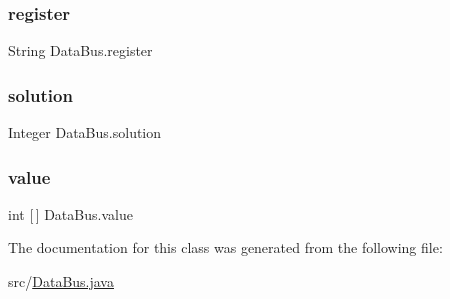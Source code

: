 \mbox{\label{class_data_bus_afd480f15b307b1c64e3511d363a4de29}} 
\subsubsection{\texorpdfstring{register}{register}}
{\footnotesize\ttfamily String Data\+Bus.\+register\hspace{0.3cm}{\ttfamily [private]}}

\mbox{\label{class_data_bus_a5d1fa383cfa9f7d575d535cc16673d69}} 
\subsubsection{\texorpdfstring{solution}{solution}}
{\footnotesize\ttfamily Integer Data\+Bus.\+solution\hspace{0.3cm}{\ttfamily [private]}}

\mbox{\label{class_data_bus_a19d6a0a609bf5e25c4fee2f1d21454d3}} 
\subsubsection{\texorpdfstring{value}{value}}
{\footnotesize\ttfamily int \mbox{[}$\,$\mbox{]} Data\+Bus.\+value\hspace{0.3cm}{\ttfamily [private]}}



The documentation for this class was generated from the following file\+:\begin{DoxyCompactItemize}
\item 
src/\mbox{\hyperlink{_data_bus_8java}{Data\+Bus.\+java}}\end{DoxyCompactItemize}
